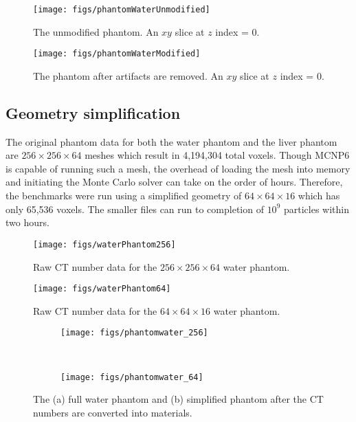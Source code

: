 \begin{figure}[tb]
  \begin{center}
   \texttt{[image: figs/phantomWaterUnmodified]}
  \end{center}
  \caption{The unmodified phantom. An $xy$ slice at $z$ index = 0.}
\label{fig:phantomWaterUnmodified}
\end{figure}

\begin{figure}[tb]
  \begin{center}
   \texttt{[image: figs/phantomWaterModified]}
  \end{center}
  \caption{The phantom after artifacts are removed. An $xy$ slice at $z$ index = 0.}
\label{fig:phantomWaterModified}
\end{figure}

\subsection{Geometry simplification}
The original phantom data for both the water phantom and the liver phantom are $256\times256\times64$ meshes which result in 4,194,304 total voxels. Though MCNP6 is capable of running such a mesh, the overhead of loading the mesh into memory and initiating the Monte Carlo solver can take on the order of hours. Therefore, the benchmarks were run using a simplified geometry of $64\times64\times16$ which has only 65,536 voxels. The smaller files can run to completion of $10^9$ particles within two hours.

\begin{figure}[tb]
  \begin{center}
   \texttt{[image: figs/waterPhantom256]}
  \end{center}
  \caption{Raw CT number data for the $256 \times 256 \times 64$ water phantom.}
\label{fig:waterPhantom256}
\end{figure}

\begin{figure}[tb]
  \begin{center}
   \texttt{[image: figs/waterPhantom64]}
  \end{center}
  \caption{Raw CT number data for the $64 \times 64 \times 16$ water phantom.}
\label{fig:waterPhantom64}
\end{figure}

\begin{figure}
    \centering
    \begin{subfigure}[b]{0.45\textwidth}
        \texttt{[image: figs/phantomwater\_256]}
        \caption{}
        \label{fig:waterHistLin}
    \end{subfigure}
    ~
    \begin{subfigure}[b]{0.45\textwidth}
        \texttt{[image: figs/phantomwater\_64]}
        \caption{}
        \label{fig:waterHistLog}
    \end{subfigure}
    \caption{The (a) full water phantom and (b) simplified phantom after the CT numbers are converted into materials.}\label{fig:waterHist}
\end{figure}

